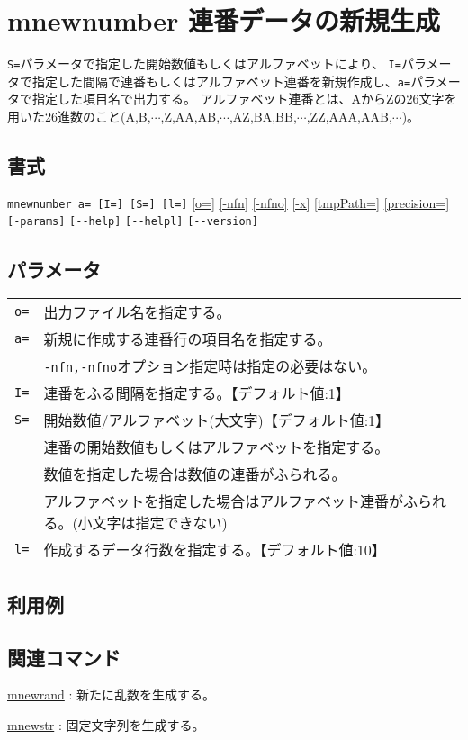 
%

\section{mnewnumber 連番データの新規生成\label{sect:mnewnumber}}
\verb|S=|パラメータで指定した開始数値もしくはアルファベットにより、
\verb|I=|パラメータで指定した間隔で連番もしくはアルファベット連番を新規作成し、\verb|a=|パラメータで指定した項目名で出力する。
アルファベット連番とは、AからZの26文字を用いた26進数のこと(A,B,$\cdots$,Z,AA,AB,$\cdots$,AZ,BA,BB,$\cdots$,ZZ,AAA,AAB,$\cdots$)。

\subsection*{書式}
\verb|mnewnumber a= [I=] [S=] [l=]|
\hyperref[sect:option_o]{[o=]}
\hyperref[sect:option_nfn]{[-nfn]} 
\hyperref[sect:option_nfno]{[-nfno]}  
\hyperref[sect:option_x]{[-x]}
\hyperref[sect:option_option_tmppath]{[tmpPath=]}
\hyperref[sect:option_precision]{[precision=]}
\verb|[-params]|
\verb|[--help]|
\verb|[--helpl]|
\verb|[--version]|\\

\subsection*{パラメータ}
\begin{table}[htbp]
{\small
\begin{tabular}{ll}
\verb|o=|    & 出力ファイル名を指定する。\\
\verb|a=|    & 新規に作成する連番行の項目名を指定する。\\
             & \verb|-nfn,-nfno|オプション指定時は指定の必要はない。\\
\verb|I=|    & 連番をふる間隔を指定する。【デフォルト値:1】\\
\verb|S=|    & 開始数値/アルファベット(大文字)【デフォルト値:1】\\
             & 連番の開始数値もしくはアルファベットを指定する。\\
             & 数値を指定した場合は数値の連番がふられる。\\
             & アルファベットを指定した場合はアルファベット連番がふられる。(小文字は指定できない)\\
\verb|l=|    & 作成するデータ行数を指定する。【デフォルト値:10】\\
\end{tabular} 
}
\end{table} 


\subsection*{利用例}


\subsection*{関連コマンド}
\hyperref[sect:mnewrand] {mnewrand} : 新たに乱数を生成する。

\hyperref[sect:mnewstr] {mnewstr} : 固定文字列を生成する。

%
